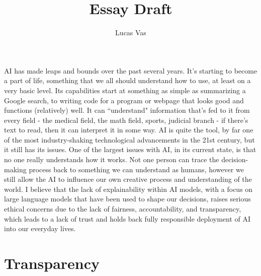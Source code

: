 \documentclass[12pt]{article}
\title{Essay Draft}
\author{Lucas Vas}
\date{}
\begin{document}
    
    \thispagestyle{firstPage}
    \maketitle
    
    AI has made leaps and bounds over the past several years. It's starting to become a part of
    life, something that we all should understand how to use, at least on a very basic level. Its
    capabilities start at something as simple as summarizing a Google search, to writing code
    for a program or webpage that looks good and functions (relatively) well. It can ``understand"
    information that's fed to it from every field - the medical field, the math field, sports, 
    judicial branch - if there's text to read, then it can interpret it in some way. AI is quite
    the tool, by far one of the most industry-shaking technological advancements in the 21st century,
    but it still has its issues. One of the largest issues with AI, in its current state, is that
    no one really understands how it works. Not one person can trace the decision-making process
    back to something we can understand as humans, however we still allow the AI to influence our
    own creative process and understanding of the world. I believe that the lack of explainability
    within AI models, with a focus on large language models that have been used to shape our
    decisions, raises serious ethical concerns due to the lack of fairness, accountability, and 
    transparency, which leads to a lack of trust and holds back fully responsible deployment of AI
    into our everyday lives.

    \section{Transparency}
\end{document}
